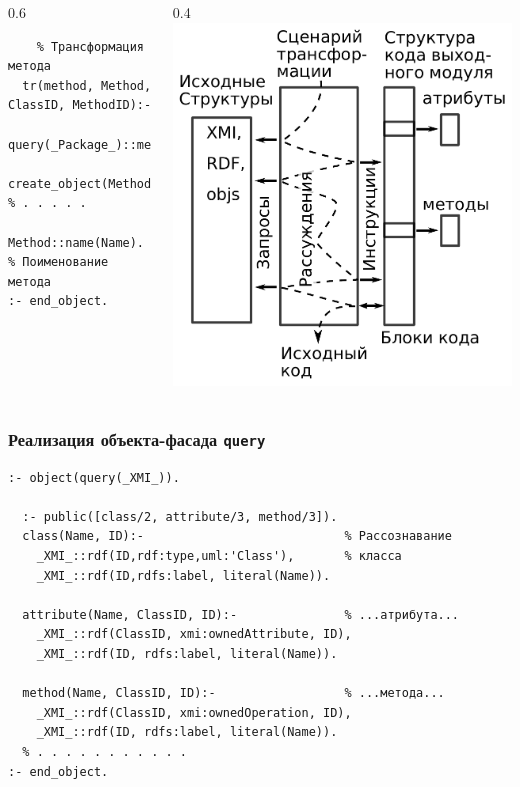\documentclass[10pt]{beamer}
\begin{document}
\begin{frame}[fragile]
\begin{columns}
\begin{column}{0.6\textwidth}
\begin{verbatim}
    % Трансформация метода
  tr(method, Method, ClassID, MethodID):-
    query(_Package_)::method(Name,ClassID,MethodID),
    create_object(Method,     % . . . . .
    Method::name(Name).       % Поименование метода
:- end_object.
\end{verbatim}
    \end{column}
    \begin{column}{0.4\linewidth}
      \includegraphics[width=1\linewidth]{scenario-ru-wo-mothur.pdf}
    \end{column}
  \end{columns}
\end{frame}

\begin{frame}[fragile]
  \frametitle{Реализация объекта-фасада \texttt{query}}
\begin{verbatim}
:- object(query(_XMI_)).

  :- public([class/2, attribute/3, method/3]).
  class(Name, ID):-                            % Рассознавание
    _XMI_::rdf(ID,rdf:type,uml:'Class'),       % класса
    _XMI_::rdf(ID,rdfs:label, literal(Name)).

  attribute(Name, ClassID, ID):-               % ...атрибута...
    _XMI_::rdf(ClassID, xmi:ownedAttribute, ID),
    _XMI_::rdf(ID, rdfs:label, literal(Name)).

  method(Name, ClassID, ID):-                  % ...метода...
    _XMI_::rdf(ClassID, xmi:ownedOperation, ID),
    _XMI_::rdf(ID, rdfs:label, literal(Name)).
  % . . . . . . . . . . .
:- end_object.
\end{verbatim}
\end{frame}
\end{document}
